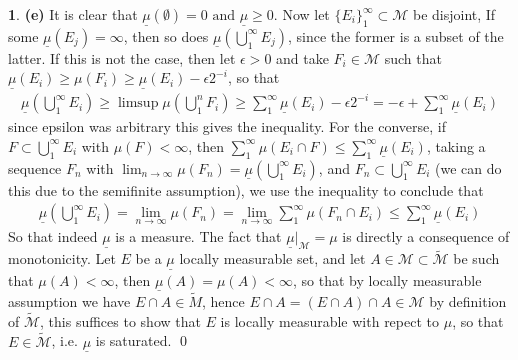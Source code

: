 \documentclass[10.5pt]{article}
\theoremstyle{definition}
\newtheorem{pb}{}
\newcommand{\set}[1]{\{#1\}}
\newcommand{\tand}{\text{ and }}
\begin{document}
\begin{pb}
        \textbf{(e)} It is clear that \(\underline{\mu}(\emptyset) = 0 \tand \underline{\mu} \geq 0\). Now let \(\set{E_i}_1^\infty \subset \mathcal{M}\) be disjoint, If some \(\underline{\mu}(E_j) = \infty\), then so does \(\underline{\mu}(\bigcup_1^\infty E_j)\), since the former is a subset of the latter. If this is not the case, then let \(\epsilon > 0\) and take \(F_i \in \mathcal{M}\) such that \(\underline{\mu}(E_i) \geq \mu(F_i) \geq \underline{\mu}(E_i) -\epsilon2^{-i}\), so that
        \begin{align*}
            \underline{\mu}(\bigcup_1^\infty E_i) \geq \limsup \mu(\bigcup_1^n F_i) \geq \sum_1^\infty \underline{\mu}(E_i) -\epsilon2^{-i} = -\epsilon + \sum_1^\infty \underline{\mu}(E_i)
        \end{align*}
        since epsilon was arbitrary this gives the inequality. For the converse, if \(F \subset \bigcup_1^\infty E_i\) with \(\mu(F) < \infty\), then \(\sum_1^\infty \mu(E_i \cap F) \leq \sum_1^\infty \underline{\mu}(E_i)\), taking a sequence \(F_n\) with \(\lim_{n\to\infty}\mu(F_n) = \underline{\mu}(\bigcup_1^\infty E_i)\), and \(F_n \subset \bigcup_1^\infty E_i\) (we can do this due to the semifinite assumption), we use the inequality to conclude that
        \begin{align*}
            \underline{\mu}(\bigcup_1^\infty E_i) = \lim_{n \to \infty}\mu(F_n) = \lim_{n \to \infty} \sum_1^\infty \mu(F_n \cap E_i) \leq \sum_1^\infty \underline{\mu}(E_i)
        \end{align*}
        So that indeed \(\underline{\mu}\) is a measure. The fact that \(\underline{\mu}\vert_\mathcal{M} = \mu\) is directly a consequence of monotonicity. Let \(E\) be a \(\underline{\mu}\) locally measurable set, and let \(A \in \mathcal{M} \subset \tilde{\mathcal{M}}\) be such that \(\mu(A) < \infty\), then \(\underline{\mu}(A) = \mu(A) < \infty\), so that by locally measurable assumption we have \(E \cap A \in \tilde{M}\), hence \(E \cap A = (E \cap A) \cap A \in \mathcal{M}\) by definition of \(\tilde{\mathcal{M}}\), this suffices to show that \(E\) is locally measurable with repect to \(\mu\), so that \(E \in \tilde{\mathcal{M}}\), i.e. \(\underline{\mu}\) is saturated. \qed


\end{pb}
\end{document}

